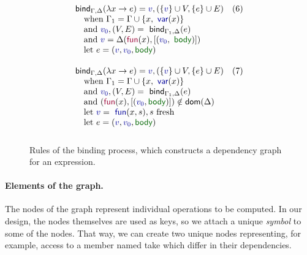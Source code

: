 \documentclass[sigplan,10pt]{acmart}\settopmatter{printfolios=true,printccs=false,printacmref=false}
\theoremstyle{plain}
\theoremstyle{definition}
\newcommand{\ident}[1]{\textnormal{\sffamily #1}}
\newcommand{\bndclr}[1]{\textcolor{kvdclr}{#1}}
\newcommand{\bnd}[1]{\textnormal{\textcolor{kvdclr}{\sffamily #1}}}
\newcommand{\bknd}[1]{\textnormal{\textcolor{prepclr}{\sffamily #1}}}
\newcommand{\blbl}[1]{\textnormal{\textcolor{numclr}{\sffamily #1}}}
\begin{document}
\begin{figure}[t]
\begin{equation*}
\begin{array}{ll}
\\[1.25em]
\ident{bind}_{\Gamma, \Delta}(\lambda x \rightarrow e) = \bndclr{v}, (\{\bndclr{v}\} \cup V, \{e\} \cup E)&(6)\\
\quad \textnormal{when}~\Gamma_1 = \Gamma \cup \{ x, \bnd{var}(x) \}\\
\quad \textnormal{and}~\bndclr{v_0}, (V, E) = \ident{bind}_{\Gamma_1, \Delta}(e)\\
\quad \textnormal{and}~\bndclr{v} = \Delta(\bknd{fun}(x),[(\bndclr{v_0}, \blbl{body})])\\
\quad \textnormal{let}~e = (\bndclr{v}, \bndclr{v_0}, \blbl{body}) 
\\[1.25em]
\ident{bind}_{\Gamma, \Delta}(\lambda x \rightarrow e) = \bndclr{v}, (\{\bndclr{v}\} \cup V, \{e\} \cup E)&(7)\\
\quad \textnormal{when}~\Gamma_1 = \Gamma \cup \{ x, \bnd{var}(x) \}\\
\quad \textnormal{and}~\bndclr{v_0}, (V, E) = \ident{bind}_{\Gamma_1, \Delta}(e)\\
\quad \textnormal{and}~(\bknd{fun}(x),[(\bndclr{v_0}, \blbl{body})])\notin \ident{dom}(\Delta)\\
\quad \textnormal{let}~\bndclr{v} = \bnd{fun}(x, s), s~\textnormal{fresh}\\
\quad \textnormal{let}~e = (\bndclr{v},\bndclr{v_0},\blbl{body}) 
\\[0.75em]
\end{array}
\end{equation*}
\caption{Rules of the binding process, which constructs a dependency graph for an expression.}
\label{fig:binding-rules}
\end{figure}

\paragraph{Elements of the graph.} The nodes of the graph represent individual operations
to be computed. In our design, the nodes themselves are used as keys, so we attach a unique 
\emph{symbol} to some of the nodes. That way, we can create two unique nodes representing, 
for example, access to a member named \ident{take} which differ in their dependencies.
\end{document}

